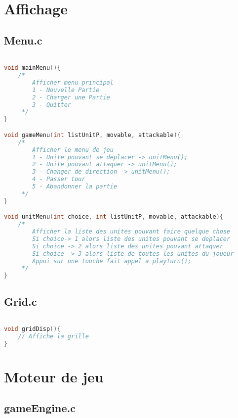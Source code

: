 \documentclass[a4paper,10pt]{extreport}
\begin{document}
\part{Affichage}

\chapter{Menu.c}
\vspace{-1cm}

\begin{lstlisting}[language=c]

void mainMenu(){
	/*
		Afficher menu principal
		1 - Nouvelle Partie
		2 - Charger une Partie
		3 - Quitter
	 */
}

void gameMenu(int listUnitP, movable, attackable){
	/*
		Afficher le menu de jeu
		1 - Unite pouvant se deplacer -> unitMenu();
		2 - Unite pouvant attaquer -> unitMenu();
		3 - Changer de direction -> unitMenu();
		4 - Passer tour
		5 - Abandonner la partie
	 */
}

void unitMenu(int choice, int listUnitP, movable, attackable){
	/*
		Afficher la liste des unites pouvant faire quelque chose
		Si choice-> 1 alors liste des unites pouvant se deplacer
		Si choice -> 2 alors liste des unites pouvant attaquer
		Si choice -> 3 alors liste de toutes les unites du joueur
		Appui sur une touche fait appel a playTurn();
	 */
}
\end{lstlisting}

\chapter{Grid.c}
\vspace{-1cm}

\begin{lstlisting}[language=c]

void gridDisp(){
	// Affiche la grille
}

\end{lstlisting}

\part{Moteur de jeu}

\chapter{gameEngine.c}
\vspace{-1cm}
\end{document}
